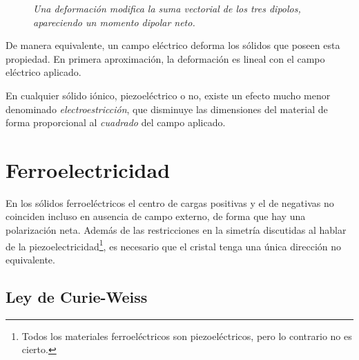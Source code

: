 \documentclass{tufte-book}
\begin{document}
\begin{figure}
  \centering
  \qquad
  \qquad
  \caption{\itshape Una deformación modifica la suma vectorial de los tres
    dipolos, apareciendo un momento dipolar neto.}
  \label{fig:dipole_120}
\end{figure}


De manera equivalente, un campo eléctrico deforma los sólidos que
poseen esta propiedad. En primera aproximación, la deformación es
lineal con el campo eléctrico aplicado.

En cualquier sólido iónico, piezoeléctrico o no, existe un efecto
mucho menor denominado \emph{electroestricción}, que disminuye las
dimensiones del material de forma proporcional al \emph{cuadrado} del
campo aplicado.

\section{Ferroelectricidad}
En los sólidos ferroeléctricos el centro de cargas positivas y el de
negativas no coinciden incluso en ausencia de campo externo, de forma
que hay una polarización neta. Además de las restricciones en la
simetría discutidas al hablar de la piezoelectricidad\footnote{Todos
  los materiales ferroeléctricos son piezoeléctricos, pero lo
  contrario no es cierto.}, es necesario
que el cristal tenga una única dirección no equivalente.

\subsection{Ley de Curie-Weiss}
\end{document}
